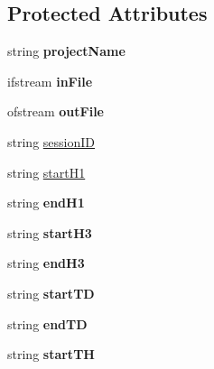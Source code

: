 \subsection*{Protected Attributes}
\begin{DoxyCompactItemize}
\item 
\hypertarget{classPageLayout_a8a3c1ddc422df2556fbc95d0cd575a05}{string {\bfseries project\-Name}}\label{classPageLayout_a8a3c1ddc422df2556fbc95d0cd575a05}

\item 
\hypertarget{classPageLayout_a9abec89a54a6f0dac84114919d2ad117}{ifstream {\bfseries in\-File}}\label{classPageLayout_a9abec89a54a6f0dac84114919d2ad117}

\item 
\hypertarget{classPageLayout_ad52913274f786e82e1e09f5df4bf5347}{ofstream {\bfseries out\-File}}\label{classPageLayout_ad52913274f786e82e1e09f5df4bf5347}

\item 
string \hyperlink{classPageLayout_ab796c4a12a3f9c089881085e508e2a1c}{session\-I\-D}
\item 
string \hyperlink{classPageStructureMaker_af41d4e21b808f5f8dc2c727f775b6fb2}{start\-H1}
\item 
\hypertarget{classPageStructureMaker_a3786a6f477632e4a60205a988d6b599d}{string {\bfseries end\-H1}}\label{classPageStructureMaker_a3786a6f477632e4a60205a988d6b599d}

\item 
\hypertarget{classPageStructureMaker_adb966c147c6328c8e48281c882de776d}{string {\bfseries start\-H3}}\label{classPageStructureMaker_adb966c147c6328c8e48281c882de776d}

\item 
\hypertarget{classPageStructureMaker_a22e6bf3eb787284b745d694613c1d9da}{string {\bfseries end\-H3}}\label{classPageStructureMaker_a22e6bf3eb787284b745d694613c1d9da}

\item 
\hypertarget{classPageStructureMaker_a7e458e675a3adf987a153e08f3795941}{string {\bfseries start\-T\-D}}\label{classPageStructureMaker_a7e458e675a3adf987a153e08f3795941}

\item 
\hypertarget{classPageStructureMaker_ad27f03939a04048a03be0f1bb8edd38a}{string {\bfseries end\-T\-D}}\label{classPageStructureMaker_ad27f03939a04048a03be0f1bb8edd38a}

\item 
\hypertarget{classPageStructureMaker_a4fe234b016efcb9eaa757879b8858190}{string {\bfseries start\-T\-H}}\label{classPageStructureMaker_a4fe234b016efcb9eaa757879b8858190}


\end{DoxyCompactItemize}
